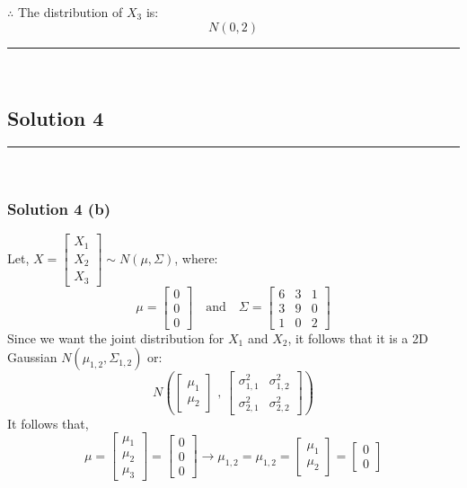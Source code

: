 \documentclass{article}
\begin{document}
\subsubsection*{\normalfont}{$\therefore$ The distribution of $X_3$ is:} 
$$N(0, 2)$$


\noindent\rule{\textwidth}{0.4pt}\\

\newpage

\subsection*{Solution 4}
\noindent\rule{\textwidth}{0.4pt}\\
\subsubsection*{Solution 4 (b)}
Let, $X = \begin{bmatrix} X_1 \\ X_2 \\ X_3 \end{bmatrix} \sim N(\mu, \Sigma)$, where:
$$ \mu = \begin{bmatrix} 0 \\ 0 \\ 0 \end{bmatrix} \quad \text{and} \quad \Sigma = \begin{bmatrix} 6 & 3 & 1 \\ 3 & 9 & 0 \\ 1 & 0 & 2 \end{bmatrix} $$
Since we want the joint distribution for $X_1$ and $X_2$, it follows that it is a 2D Gaussian $N(\mu_{1,2}, \Sigma_{1,2})$ or:
$$N\left(\begin{bmatrix} \mu_1 \\ \mu_2 \end{bmatrix}\text{ ,  }\begin{bmatrix} \sigma_{1,1}^2 & \sigma_{1,2}^2 \\ \sigma_{2,1}^2 & \sigma_{2,2}^2 \end{bmatrix}\right)$$
It follows that,
$$\mu = \begin{bmatrix} \mu_1 \\ \mu_2 \\ \mu_3 \end{bmatrix} = \begin{bmatrix} 0 \\ 0 \\ 0 \end{bmatrix} \rightarrow \mu_{1,2} = \mu_{1,2} = \begin{bmatrix} \mu_1 \\ \mu_2 \end{bmatrix} = \begin{bmatrix} 0 \\ 0 \end{bmatrix}$$
\end{document}
